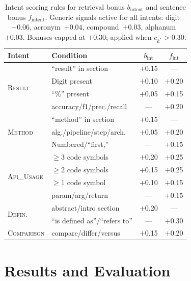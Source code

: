 \documentclass[conference]{IEEEtran}
\begin{document}
\begin{table}[!t]
\centering
\caption{Intent scoring rules for retrieval bonus $b_{\mathrm{intent}}$
and sentence bonus $f_{\mathrm{intent}}$. Generic signals active
for all intents: digit~$+0.06$, acronym~$+0.04$,
compound~$+0.03$, alphanum~$+0.03$.
Bonuses capped at $+0.30$; applied when $c_{k^*}>0.30$.}
\label{tab:scoring}
\begin{tabular}{@{}llcc@{}}
\toprule
\textbf{Intent} & \textbf{Condition} & $b_{\mathrm{int}}$ & $f_{\mathrm{int}}$ \\
\midrule
\multirow{4}{*}{\textsc{Result}}
  & ``result'' in section & $+$0.15 & --- \\
  & Digit present & $+$0.10 & $+$0.20 \\
  & ``\%'' present & $+$0.05 & $+$0.15 \\
  & accuracy/f1/prec./recall & --- & $+$0.20 \\
\midrule
\multirow{3}{*}{\textsc{Method}}
  & ``method'' in section & $+$0.15 & --- \\
  & alg./pipeline/step/arch. & $+$0.05 & $+$0.20 \\
  & Numbered/``first,'' & --- & $+$0.15 \\
\midrule
\multirow{4}{*}{\textsc{Api\_Usage}}
  & $\geq$3 code symbols & $+$0.20 & $+$0.25 \\
  & $\geq$2 code symbols & $+$0.15 & $+$0.25 \\
  & $\geq$1 code symbol & $+$0.10 & $+$0.15 \\
  & param/arg/return & --- & $+$0.15 \\
\midrule
\multirow{2}{*}{\textsc{Defin.}}
  & abstract/intro section & $+$0.20 & --- \\
  & ``is defined as''/``refers to'' & --- & $+$0.30 \\
\midrule
\textsc{Comparison} & compare/differ/versus & $+$0.15 & $+$0.20 \\
\bottomrule
\end{tabular}
\end{table}

\section{Results and Evaluation}
\end{document}
